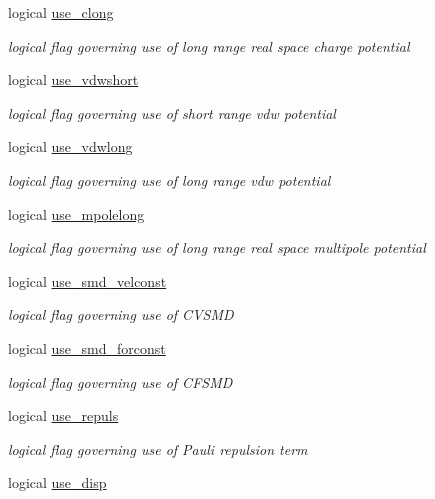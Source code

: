 \begin{DoxyCompactItemize}
logical \hyperlink{classpotent_aeb5672c3b82da40d633872040c58b376}{use\-\_\-clong}
\begin{DoxyCompactList}\small\item\em logical flag governing use of long range real space charge potential \end{DoxyCompactList}\item 
logical \hyperlink{classpotent_a767fd97701d5ddfcce6bf907c43832d7}{use\-\_\-vdwshort}
\begin{DoxyCompactList}\small\item\em logical flag governing use of short range vdw potential \end{DoxyCompactList}\item 
logical \hyperlink{classpotent_ab70fe3ec7b82b9065c25f4f051395663}{use\-\_\-vdwlong}
\begin{DoxyCompactList}\small\item\em logical flag governing use of long range vdw potential \end{DoxyCompactList}\item 
logical \hyperlink{classpotent_ab25ad95c8d922a447b35fe4f4d582a1d}{use\-\_\-mpolelong}
\begin{DoxyCompactList}\small\item\em logical flag governing use of long range real space multipole potential \end{DoxyCompactList}\item 
logical \hyperlink{classpotent_a82a41d34836bbf30d7e5f88ee70101b1}{use\-\_\-smd\-\_\-velconst}
\begin{DoxyCompactList}\small\item\em logical flag governing use of C\-V\-S\-M\-D \end{DoxyCompactList}\item 
logical \hyperlink{classpotent_a5ef3f724b2f1d64056187c24b7e9b223}{use\-\_\-smd\-\_\-forconst}
\begin{DoxyCompactList}\small\item\em logical flag governing use of C\-F\-S\-M\-D \end{DoxyCompactList}\item 
logical \hyperlink{classpotent_ad6d0ca7f83b5d630f4fed9837bf01d72}{use\-\_\-repuls}
\begin{DoxyCompactList}\small\item\em logical flag governing use of Pauli repulsion term \end{DoxyCompactList}\item 
logical \hyperlink{classpotent_aada9db6176ba5bf4284f84a4b9b182e3}{use\-\_\-disp}

\end{DoxyCompactItemize}
